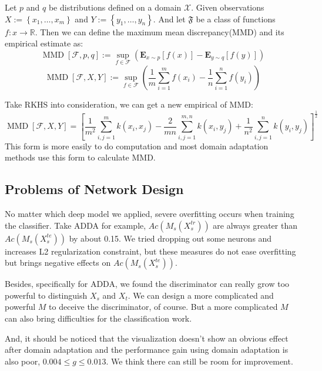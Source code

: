 \documentclass[conference]{IEEEtran}
\begin{document}
Let $p$ and $q$ be distributions defined on a domain $\mathcal{X}$. Given observations $X := \left\{x_{1}, \dots, x_{m}\right\}$ and $Y :=\left\{y_{1}, \dots, y_{n}\right\}$. And let $\mathfrak{F}$ be a class of functions $f : x \rightarrow \mathbb{R}$. Then we can define the maximum mean discrepancy(MMD) and its empirical estimate as:
\begin{equation}
\operatorname{MMD}[\mathcal{F}, p, q] :=\sup _{f \in \mathcal{F}}\left(\mathbf{E}_{x \sim p}[f(x)]-\mathbf{E}_{y \sim q}[f(y)]\right)
\end{equation}
\begin{equation}
\operatorname{MMD}[\mathcal{F}, X, Y] :=\sup _{f \in \mathcal{F}}\left(\frac{1}{m} \sum_{i=1}^{m} f\left(x_{i}\right)-\frac{1}{n} \sum_{i=1}^{n} f\left(y_{i}\right)\right)
\end{equation}

Take RKHS into consideration, we can get a new empirical of MMD:
\begin{equation}
\operatorname{MMD}[\mathcal{F}, X, Y]=\left[\frac{1}{m^{2}} \sum_{i, j=1}^{m} k\left(x_{i}, x_{j}\right)-\frac{2}{m n} \sum_{i, j=1}^{m, n} k\left(x_{i}, y_{j}\right)+\frac{1}{n^{2}} \sum_{i, j=1}^{n} k\left(y_{i}, y_{j}\right)\right]^{\frac{1}{2}}
\end{equation}
This form is more easily to do computation and most domain adaptation methods use this form to calculate MMD.
\subsection{Problems of Network Design}
No matter which deep model we applied, severe overfitting occurs when training the classifier. Take ADDA for example, $Ac(M_s(X^{tr}_s))$ are always greater than $Ac(M_s(X^{te}_s))$ by about 0.15. We tried dropping out some neurons and increases L2 regularization constraint, but these measures do not ease overfitting but brings negative effects on $Ac(M_s(X^{te}_s))$.

Besides, specifically for ADDA, we found the discriminator can really grow too powerful to distinguish $X_s$ and $X_t$. We can design a more complicated and powerful $M$ to deceive the discriminator, of course. But a more complicated $M$ can also bring difficulties for the classification work.

And, it should be noticed that the visualization doesn't show an obvious effect after domain adaptation and the performance gain using domain adaptation is also poor, $0.004 \leq g \leq 0.013$. We think there can still be room for improvement.
\end{document}
